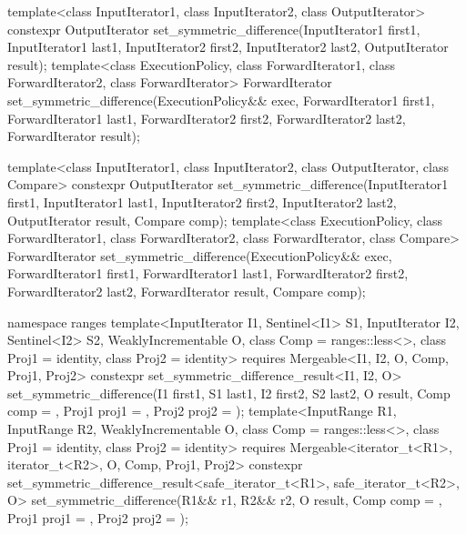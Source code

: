 %
\begin{itemdecl}
template<class InputIterator1, class InputIterator2,
         class OutputIterator>
  constexpr OutputIterator
    set_symmetric_difference(InputIterator1 first1, InputIterator1 last1,
                             InputIterator2 first2, InputIterator2 last2,
                             OutputIterator result);
template<class ExecutionPolicy, class ForwardIterator1, class ForwardIterator2,
         class ForwardIterator>
  ForwardIterator
    set_symmetric_difference(ExecutionPolicy&& exec,
                             ForwardIterator1 first1, ForwardIterator1 last1,
                             ForwardIterator2 first2, ForwardIterator2 last2,
                             ForwardIterator result);

template<class InputIterator1, class InputIterator2,
         class OutputIterator, class Compare>
  constexpr OutputIterator
    set_symmetric_difference(InputIterator1 first1, InputIterator1 last1,
                             InputIterator2 first2, InputIterator2 last2,
                             OutputIterator result, Compare comp);
template<class ExecutionPolicy, class ForwardIterator1, class ForwardIterator2,
         class ForwardIterator, class Compare>
  ForwardIterator
    set_symmetric_difference(ExecutionPolicy&& exec,
                             ForwardIterator1 first1, ForwardIterator1 last1,
                             ForwardIterator2 first2, ForwardIterator2 last2,
                             ForwardIterator result, Compare comp);

namespace ranges {
  template<InputIterator I1, Sentinel<I1> S1, InputIterator I2, Sentinel<I2> S2,
      WeaklyIncrementable O, class Comp = ranges::less<>, class Proj1 = identity, class Proj2 = identity>
    requires Mergeable<I1, I2, O, Comp, Proj1, Proj2>
    constexpr set_symmetric_difference_result<I1, I2, O>
      set_symmetric_difference(I1 first1, S1 last1, I2 first2, S2 last2, O result,
                               Comp comp = {}, Proj1 proj1 = {},
                               Proj2 proj2 = {});
  template<InputRange R1, InputRange R2, WeaklyIncrementable O,
      class Comp = ranges::less<>, class Proj1 = identity, class Proj2 = identity>
    requires Mergeable<iterator_t<R1>, iterator_t<R2>, O, Comp, Proj1, Proj2>
    constexpr set_symmetric_difference_result<safe_iterator_t<R1>, safe_iterator_t<R2>, O>
      set_symmetric_difference(R1&& r1, R2&& r2, O result, Comp comp = {},
                               Proj1 proj1 = {}, Proj2 proj2 = {});
}
\end{itemdecl}

